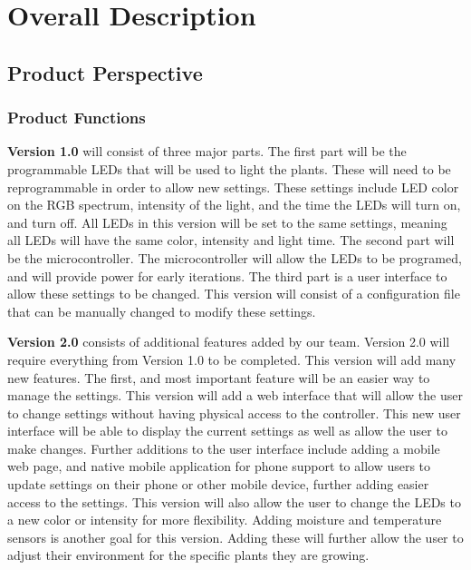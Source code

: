 	\section{Overall Description}
		\subsection{Product Perspective}

		\subsubsection{Product Functions}
		\noindent \textbf{Version 1.0} will consist of three major parts. The first part will be the programmable LEDs that will be used to light the plants. These will need to be reprogrammable in order to allow new settings.
		These settings include LED color on the RGB spectrum, intensity of the light, and the time the LEDs will turn on, and turn off. All LEDs in this version will be set to the same settings, meaning all
		LEDs will have the same color, intensity and light time. The second part will be the microcontroller. The microcontroller will allow the LEDs to be programed, and will provide power for early iterations.
		The third part is a user interface to allow these settings to be changed. This version will consist of a configuration file that can be manually changed to modify these settings.

		\noindent \textbf{Version 2.0} consists of additional features added by our team. Version 2.0 will require everything from Version 1.0 to be completed. This version will add many new features. The first, and most
		important feature will be an easier way to manage the settings. This version will add a web interface that will allow the user to change settings without having physical access to the controller.
		This new user interface will be able to display the current settings as well as allow the user to make changes. Further additions to the user interface include adding a mobile web page, and native mobile application for
		phone support to allow users to update settings on their phone or other mobile device, further adding easier access to the settings. This version will also allow the user to change the LEDs to a new color or intensity for more flexibility. Adding moisture and temperature sensors is another goal for this version. Adding these will further allow the user to adjust
		their environment for the specific plants they are growing.

